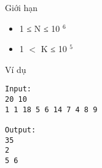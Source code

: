 Giới hạn
\begin{itemize}
	\item     1 ≤ N ≤ 10    $^     6    $
	\item     1 $<$ K ≤ 10    $^     5    $
\end{itemize}
Ví dụ
\begin{verbatim}
Input:
20 10
1 1 18 5 6 14 7 4 8 9

Output:
35
2
5 6
\end{verbatim}